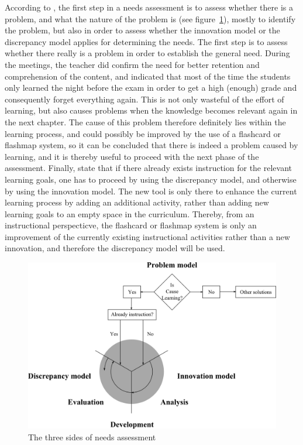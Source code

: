 According to , the first step in a needs assessment is to assess whether there is a problem, and what the nature of the problem is (see figure~\ref{fig:needsassessment}), mostly to identify the problem, but also in order to assess whether the innovation model or the discrepancy model applies for determining the needs. The first step is to assess whether there really is a problem in order to establish the general need. During the meetings, the teacher did confirm the need for better retention and comprehension of the content, and indicated that most of the time the students only learned the night before the exam in order to get a high (enough) grade and consequently forget everything again. This is not only wasteful of the effort of learning, but also causes problems when the knowledge becomes relevant again in the next chapter. The cause of this problem therefore definitely lies within the learning process, and could possibly be improved by the use of a flashcard or flashmap system, so it can be concluded that there is indeed a problem caused by learning, and it is thereby useful to proceed with the next phase of the assessment. Finally,  state that if there already exists instruction for the relevant learning goals, one has to proceed by using the discrepancy model, and otherwise by using the innovation model. The new tool is only there to enhance the current learning process by adding an additional activity, rather than adding new learning goals to an empty space in the curriculum. Thereby, from an instructional perspecticve, the flashcard or flashmap system is only an improvement of the currently existing instructional activities rather than a new innovation, and therefore the discrepancy model will be used.

\begin{figure}
    \centering
    \includegraphics[width=\textwidth]{img/needsassessment.png}
    \caption{The three sides of needs assessment \protect\cite{instructionaldesign}}
    \label{fig:needsassessment}
\end{figure}

